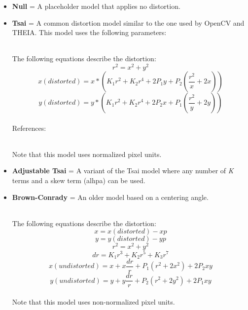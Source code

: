 \begin{itemize}{}
\item  \textbf{Null} = A placeholder model that applies no distortion.

\item  \textbf{Tsai} = A common distortion model similar to the one used by OpenCV and THEIA.
 This model uses the following parameters:
\hfill \\ The following equations describe the distortion:
\[ r^{2} = x^{2} + y^{2} \]
\[ x(distorted) = x*(K_{1}r^{2} + K_{2}r^{4} + 2P_{1}y + P_{2}(\frac{r^{2}}{x} + 2x)) \]
\[ y(distorted) = y*(K_{1}r^{2} + K_{2}r^{4} + 2P_{2}x + P_{1}(\frac{r^{2}}{y} + 2y))  \]
\hfill \\ References:
\hfill \\ Note that this model uses normalized pixel units.

\item  \textbf{Adjustable Tsai} = A variant of the Tsai model where any number of \textit{K} terms and a skew term (alhpa) can be used.

\item  \textbf{Brown-Conrady} = An older model based on a centering angle.
\hfill \\ The following equations describe the distortion:
\[ x = x(distorted) - xp \]
\[ y = y(distorted) - yp \]
\[ r^{2} = x^{2} + y^{2} \]
\[ dr = K_{1}r^{3} + K_{2}r^{5} + K_{3}r^{7} \]
\[ x(undistorted) = x + x\frac{dr}{r} + P_{1}(r^{2} +2x^{2}) + 2P_{2}xy \]
\[ y(undistorted) = y + y\frac{dr}{r} + P_{2}(r^{2} +2y^{2}) + 2P_{1}xy \]
\hfill \\ Note that this model uses non-normalized pixel units.


\end{itemize}
